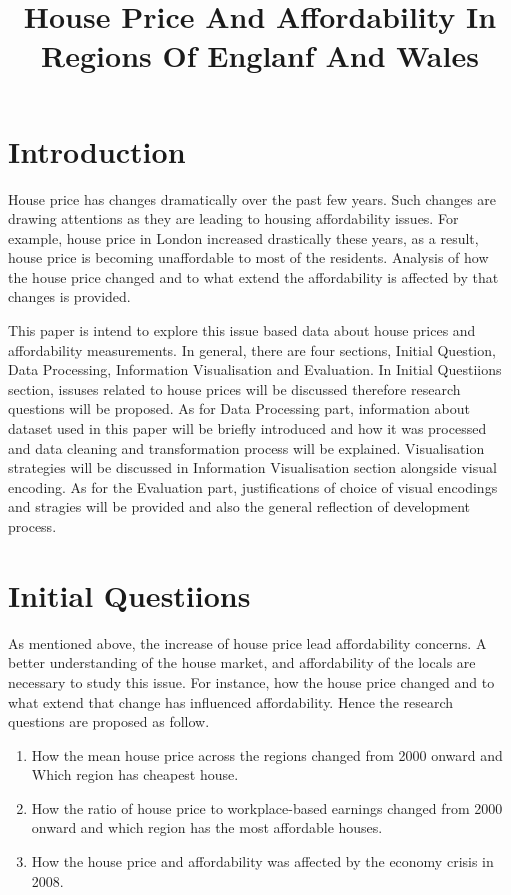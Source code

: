 \documentclass{article}
\title{House Price And Affordability In Regions Of Englanf And Wales}
\begin{document}
%
\maketitle
%

\section{Introduction}
House price has changes dramatically over the past few years. Such changes are drawing 
attentions as they are leading to housing affordability issues. For example, house price 
in London increased drastically these years, as a result, house price is becoming unaffordable
to most of the residents. Analysis of how the house price changed and 
to what extend the affordability is affected by that changes is provided.

This paper is intend to explore this issue based data about house prices and affordability measurements. 
In general, there are four sections, Initial Question, Data Processing, Information Visualisation and Evaluation.
In Initial Questiions section, issuses related to house prices will be discussed therefore research questions 
will be proposed. As for Data Processing part, information about dataset used in this paper will be briefly 
introduced and how it was processed and data cleaning and transformation process will be explained. 
Visualisation strategies will be discussed in Information Visualisation section alongside visual encoding. 
As for the Evaluation part, justifications of choice of visual encodings and stragies will be 
provided and also the general reflection of development process.

\section{Initial Questiions}
As mentioned above, the increase of house price lead affordability concerns. A better understanding of 
the house market, and affordability of the locals are necessary to study this issue. For instance, 
how the house price changed and to what extend that change has influenced affordability. Hence 
the research questions are proposed as follow.

\begin{enumerate}
  \item How the mean house price across the regions changed 
  from 2000 onward and Which region has cheapest house.
  \item How the ratio of house price to workplace-based earnings
  changed from 2000 onward and which region has the most affordable
  houses.
  \item How the house price and affordability was affected by the economy crisis in 2008.
\end{enumerate}
\end{document}
